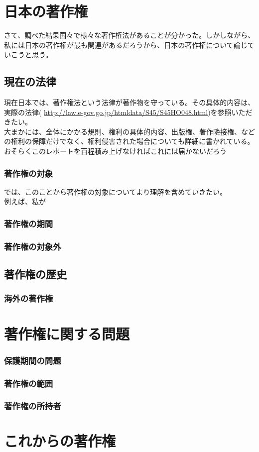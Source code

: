 \documentclass[a4j]{jsarticle}
\begin{document}
\chapter{日本の著作権}
さて、調べた結果国々で様々な著作権法があることが分かった。しかしながら、私には日本の著作権が最も関連があるだろうから、日本の著作権について論じていこうと思う。
\section{現在の法律}
現在日本では、著作権法という法律が著作物を守っている。その具体的内容は、実際の法律( \url{http://law.e-gov.go.jp/htmldata/S45/S45HO048.html})を参照いただきたい。\\
大まかには、全体にかかる規則、権利の具体的内容、出版権、著作隣接権、などの権利の保障だけでなく、権利侵害された場合についても詳細に書かれている。おそらくこのレポートを百程積み上げなければこれには届かないだろう
\subsection*{著作権の対象}
では、このことから著作権の対象についてより理解を含めていきたい。\\
例えば、私が
\subsection*{著作権の期間}
\subsection*{著作権の対象外}
\section{著作権の歴史}
\subsection*{海外の著作権}
\chapter{著作権に関する問題}
\subsection{保護期間の問題}
\subsection{著作権の範囲}
\subsection{著作権の所持者}
\chapter{これからの著作権}
\end{document}
